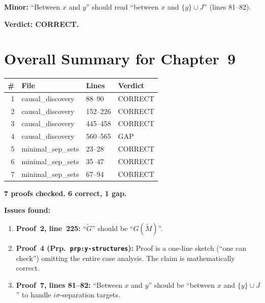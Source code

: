 \documentclass{article}
\begin{document}
\textbf{Minor:} ``Between $x$ and $y$'' should read ``between $x$ and
$\{y\}\cup J$'' (lines 81--82).

\textbf{Verdict: CORRECT.}

\section*{Overall Summary for Chapter~9}

\begin{center}
\begin{tabular}{r|l|l|l}
\textbf{\#} & \textbf{File} & \textbf{Lines} & \textbf{Verdict} \\ \hline
1  & causal\_discovery  & 88--90    & CORRECT \\
2  & causal\_discovery  & 152--226  & CORRECT \\
3  & causal\_discovery  & 445--458  & CORRECT \\
4  & causal\_discovery  & 560--565  & GAP \\
5  & minimal\_sep\_sets & 23--28    & CORRECT \\
6  & minimal\_sep\_sets & 35--47    & CORRECT \\
7  & minimal\_sep\_sets & 67--94    & CORRECT \\
\end{tabular}
\end{center}

\textbf{7 proofs checked.  6 correct, 1 gap.}

\bigskip\noindent
\textbf{Issues found:}
\begin{enumerate}
  \item \textbf{Proof~2, line~225:} ``$\tilde G$'' should be ``$G(\tilde M)$''.
  \item \textbf{Proof~4 (Prp.\ \texttt{prp:y-structures}):}
    Proof is a one-line sketch (``one can check'') omitting the entire
    case analysis.  The claim is mathematically correct.
  \item \textbf{Proof~7, lines 81--82:} ``Between $x$ and $y$'' should be
    ``between $x$ and $\{y\}\cup J$'' to handle $i\sigma$-separation targets.
\end{enumerate}
\end{document}
